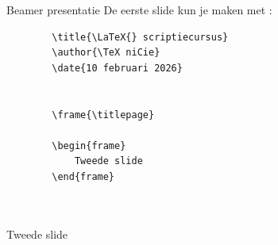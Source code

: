 \begin{frame}[fragile=singleslide]{Beamer presentatie}
    De eerste slide kun je maken met \texttt{\titlepage}:
    \begin{verbatim}
        \title{\LaTeX{} scriptiecursus}
        \author{\TeX niCie}
        \date{10 februari 2026}

        
        \frame{\titlepage}

        \begin{frame}
            Tweede slide
        \end{frame}

        
    \end{verbatim}

\end{frame}

\frame{\titlepage}
\begin{frame}
    Tweede slide
\end{frame}
